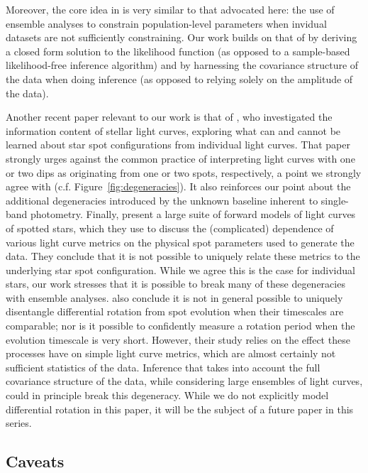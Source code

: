 \documentclass[modern]{aastex62}
\begin{document}
Moreover, the core idea in \citet{Morris2020}
\citep[and in related studies such as][]{Jackson2013}
is very similar
to that advocated here: the use of ensemble analyses to constrain population-level
parameters when invidual datasets are not sufficiently constraining.
Our work builds on that of \citet{Morris2020} by deriving a closed form
solution to the likelihood function (as opposed to a sample-based
likelihood-free inference algorithm) and by harnessing the covariance
structure of the data when doing inference (as opposed to relying solely
on the amplitude of the data).

Another recent paper relevant to our work is that of \citet{Basri2020}, who
investigated the information content of stellar light curves, exploring what
can and cannot be learned about star spot configurations from individual
light curves. That paper strongly urges against the common practice
of interpreting
light curves with one or two dips as originating from one or two spots,
respectively, a point we strongly agree with (c.f. Figure~\ref{fig:degeneracies}).
It also reinforces our point about the additional degeneracies introduced
by the unknown baseline inherent to single-band photometry.
%
Finally, \citet{Basri2020} present a large suite of forward models of light curves of
spotted stars, which they use to discuss the (complicated) dependence of
various light curve metrics on
the physical spot parameters used to generate the data. They conclude that it
is not possible to uniquely relate these metrics to the underlying star spot
configuration. While we agree this is the case for individual stars, our work
stresses that it is possible to break many of these degeneracies with
ensemble analyses.
%
\citet{Basri2020} also conclude it is not in general possible to
uniquely disentangle differential rotation from spot evolution when their
timescales are comparable; nor is it possible to confidently measure a rotation
period when the evolution timescale is very short. However, their study
relies on the effect these processes have on simple light curve metrics,
which are almost certainly not sufficient statistics of the data. Inference
that takes into account the full covariance structure of the data, while
considering large ensembles of light curves, could in principle break
this degeneracy. While we do not explicitly model differential rotation in
this paper, it will be the subject of a future paper in this series.

\subsection{Caveats}
\label{sec:caveats}
\end{document}
